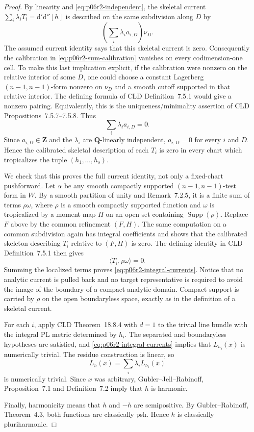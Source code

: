 \begin{proof}
By linearity and \eqref{eq:p06r2-independent}, the skeletal current
$\sum_i\lambda_iT_i=\mathrm d'\mathrm d''[h]$ is described on the same
subdivision along $D$ by
\begin{equation}
\label{eq:p06r2-sum-calibration}
                         \left(\sum_i\lambda_i a_{i,D}\right)\nu_D.
\end{equation}
The assumed current identity says that this skeletal current is zero.
Consequently the calibration in \eqref{eq:p06r2-sum-calibration} vanishes
on every codimension-one cell.  To make this last implication explicit,
if the calibration were nonzero on the relative interior of some $D$, one
could choose a constant Lagerberg $(n-1,n-1)$-form nonzero on $\nu_D$ and
a smooth cutoff supported in that relative interior.  The defining formula
of CLD Definition~7.5.1 would give a nonzero pairing.  Equivalently, this is
the uniqueness/minimality assertion of CLD Propositions~7.5.7--7.5.8.
Thus
\[
                         \sum_i\lambda_i a_{i,D}=0.
\]
Since $a_{i,D}\in\mathbf Z$ and the $\lambda_i$ are
$\mathbf Q$-linearly independent, $a_{i,D}=0$ for every $i$ and $D$.
Hence the calibrated skeletal description of each $T_i$ is zero in every
chart which tropicalizes the tuple $(h_1,\ldots,h_s)$.

We check that this proves the full current identity, not only a fixed-chart
pushforward.  Let $\alpha$ be any smooth compactly supported
$(n-1,n-1)$-test form in $W$.  By a smooth partition of unity and
Remark~7.2.5, it is a finite sum of terms $\rho\omega$, where $\rho$ is a
smooth compactly supported function and $\omega$ is tropicalized by a
moment map $H$ on an open set containing $\operatorname{Supp}(\rho)$.
Replace $F$ above by the common refinement $(F,H)$.  The same computation
on a common subdivision again has integral coefficients and shows that the
calibrated skeleton describing $T_i$ relative to $(F,H)$ is zero.  The
defining identity in CLD Definition~7.5.1 then gives
\[
                         \langle T_i,\rho\omega\rangle=0.
\]
Summing the localized terms proves
\eqref{eq:p06r2-integral-currents}.  Notice that no analytic current is
pulled back and no target representative is required to avoid the image of
the boundary of a compact analytic domain.  Compact support is carried by
$\rho$ on the open boundaryless space, exactly as in the definition of a
skeletal current.

For each $i$, apply CLD Theorem~18.8.4 with $d=1$ to the trivial line
bundle with the integral PL metric determined by $h_i$.  The separated and
boundaryless hypotheses are satisfied, and
\eqref{eq:p06r2-integral-currents} implies that $L_{h_i}(x)$ is numerically
trivial.  The residue construction is linear, so
\[
                         L_h(x)=\sum_i\lambda_iL_{h_i}(x)
\]
is numerically trivial.  Since $x$ was arbitrary, Gubler--Jell--Rabinoff,
Proposition~7.1 and Definition~7.2 imply that $h$ is harmonic.

Finally, harmonicity means that $h$ and $-h$ are semipositive.  By
Gubler--Rabinoff, Theorem~4.3, both functions are classically psh.  Hence
$h$ is classically pluriharmonic.
\end{proof}

